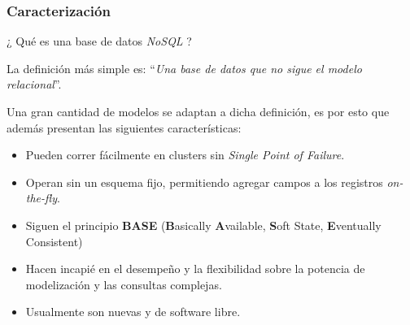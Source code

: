 \begin{frame}
    \frametitle{Caracterización}

    ¿ Qué es una base de datos \textit{NoSQL} ?

     
    
    La definición más simple es: ``\textit{Una base de datos que no sigue el modelo relacional}''.

      

    Una gran cantidad de modelos se adaptan a dicha definición, es por esto que además presentan las siguientes características:

     
    
    \begin{itemize}
        \item Pueden correr fácilmente en clusters sin \textit{Single Point of Failure}.             
        \item Operan sin un esquema fijo, permitiendo agregar campos a los registros \textit{on-the-fly}.     
        \item Siguen el principio \textbf{BASE} (\textbf{B}asically \textbf{A}vailable, \textbf{S}oft State, \textbf{E}ventually Consistent)  
        \item Hacen incapié en el desempeño y la flexibilidad sobre la potencia de modelización y las consultas complejas.  
        \item Usualmente son nuevas y de software libre.
    \end{itemize}
    
\end{frame}